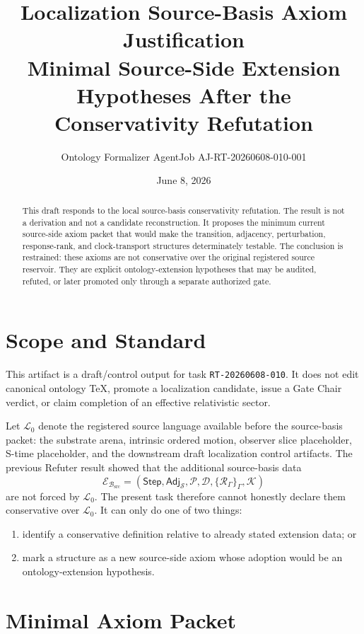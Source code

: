\documentclass[11pt]{article}
\title{\textbf{Localization Source-Basis Axiom Justification}\\[0.35em]
\large Minimal Source-Side Extension Hypotheses After the Conservativity Refutation}
\author{Ontology Formalizer AgentJob AJ-RT-20260608-010-001}
\date{June 8, 2026}
\newcommand{\Step}{\mathsf{Step}}
\newcommand{\Adj}{\mathsf{Adj}_{\mathcal{S}}}
\newcommand{\RespAlg}{\mathcal{R}_{\Gamma}}
\newcommand{\Basis}{\mathcal{B}_{\mathrm{src}}}
\newcommand{\Lang}{\mathcal{L}_{0}}
\newcommand{\Ext}{\mathcal{E}_{\Basis}}
\begin{document}
\maketitle

\begin{abstract}
This draft responds to the local source-basis conservativity refutation. The
result is not a derivation and not a candidate reconstruction. It proposes the
minimum current source-side axiom packet that would make the transition,
adjacency, perturbation, response-rank, and clock-transport structures
determinately testable. The conclusion is restrained: these axioms are not
conservative over the original registered source reservoir. They are explicit
ontology-extension hypotheses that may be audited, refuted, or later promoted
only through a separate authorized gate.
\end{abstract}

\section{Scope and Standard}

This artifact is a draft/control output for task
\texttt{RT-20260608-010}. It does not edit canonical ontology TeX, promote a
localization candidate, issue a Gate Chair verdict, or claim completion of an
effective relativistic sector.

Let \(\Lang\) denote the registered source language available before the
source-basis packet: the substrate arena, intrinsic ordered motion, observer
slice placeholder, S-time placeholder, and the downstream draft localization
control artifacts. The previous Refuter result showed that the additional
source-basis data
\[
\Ext =
(\Step,\Adj,\mathcal{P},\mathcal{D},\{\RespAlg\}_{\Gamma},\mathcal{K})
\]
are not forced by \(\Lang\). The present task therefore cannot honestly
declare them conservative over \(\Lang\). It can only do one of two things:
\begin{enumerate}
    \item identify a conservative definition relative to already stated
    extension data; or
    \item mark a structure as a new source-side axiom whose adoption would be
    an ontology-extension hypothesis.
\end{enumerate}

\section{Minimal Axiom Packet}
\end{document}
